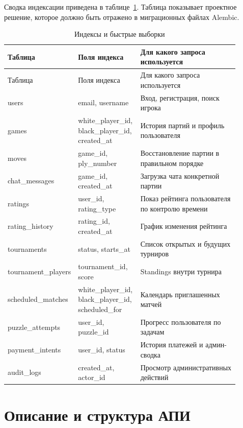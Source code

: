 Сводка индексации приведена в таблице~\ref{tab:db-indexes}. Таблица показывает проектное решение, которое должно быть отражено в миграционных файлах Alembic.

\noindent\scriptsize
\setlength{\tabcolsep}{3pt}
\renewcommand{\arraystretch}{1.16}
\begin{longtable}{|>{\RaggedRight\arraybackslash}p{0.20\linewidth}|>{\RaggedRight\arraybackslash}p{0.27\linewidth}|>{\RaggedRight\arraybackslash}p{0.43\linewidth}|}
\caption{Индексы и быстрые выборки}\label{tab:db-indexes}\\
\hline
Таблица & Поля индекса & Для какого запроса используется\\ \hline
\endfirsthead
\hline
Таблица & Поля индекса & Для какого запроса используется\\ \hline
\endhead
users & email, username & Вход, регистрация, поиск игрока\\ \hline
games & white_player_id, black_player_id, created_at & История партий и профиль пользователя\\ \hline
moves & game_id, ply_number & Восстановление партии в правильном порядке\\ \hline
chat_messages & game_id, created_at & Загрузка чата конкретной партии\\ \hline
ratings & user_id, rating_type & Показ рейтинга пользователя по контролю времени\\ \hline
rating_history & rating_id, created_at & График изменения рейтинга\\ \hline
tournaments & status, starts_at & Список открытых и будущих турниров\\ \hline
tournament_players & tournament_id, score & Standings внутри турнира\\ \hline
scheduled_matches & white_player_id, black_player_id, scheduled_for & Календарь приглашенных матчей\\ \hline
puzzle_attempts & user_id, puzzle_id & Прогресс пользователя по задачам\\ \hline
payment_intents & user_id, status & История платежей и админ-сводка\\ \hline
audit_logs & created_at, actor_id & Просмотр административных действий\\ \hline
\end{longtable}
\normalsize

\section{Описание и структура АПИ}

